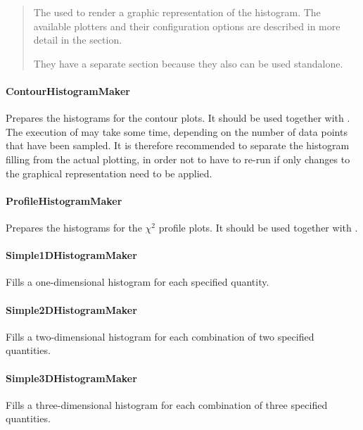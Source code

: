 \documentclass[letterpaper,10pt,english]{sphinxmanual}
\begin{document}
\begin{quote}

The  used to render a graphic representation of the histogram. The available plotters
and their configuration options are described in more detail in the section.

They have a separate section because they also can be used standalone.
\end{quote}


\paragraph{ContourHistogramMaker}
\label{contour_histogrammaker:contourhistogrammaker}\label{contour_histogrammaker::doc}
Prepares the histograms for the contour plots. It should be used together with .
The execution of  may take some time, depending on the number of data
points that have been sampled. It is therefore recommended to separate the histogram filling from
the actual plotting, in order not to have to re-run  if only changes to the
graphical representation need to be applied.


\paragraph{ProfileHistogramMaker}
\label{profile_histogrammaker:profilehistogrammaker}\label{profile_histogrammaker::doc}
Prepares the histograms for the \(\chi^2\) profile plots. It should be used together with
.


\paragraph{Simple1DHistogramMaker}
\label{simple1D_histogrammaker:simple1dhistogrammaker}\label{simple1D_histogrammaker::doc}
Fills a one-dimensional histogram for each specified quantity.


\paragraph{Simple2DHistogramMaker}
\label{simple2D_histogrammaker:simple2dhistogrammaker}\label{simple2D_histogrammaker::doc}
Fills a two-dimensional histogram for each combination of two specified quantities.


\paragraph{Simple3DHistogramMaker}
\label{simple3D_histogrammaker::doc}\label{simple3D_histogrammaker:simple3dhistogrammaker}
Fills a three-dimensional histogram for each combination of three specified quantities.
\end{document}
